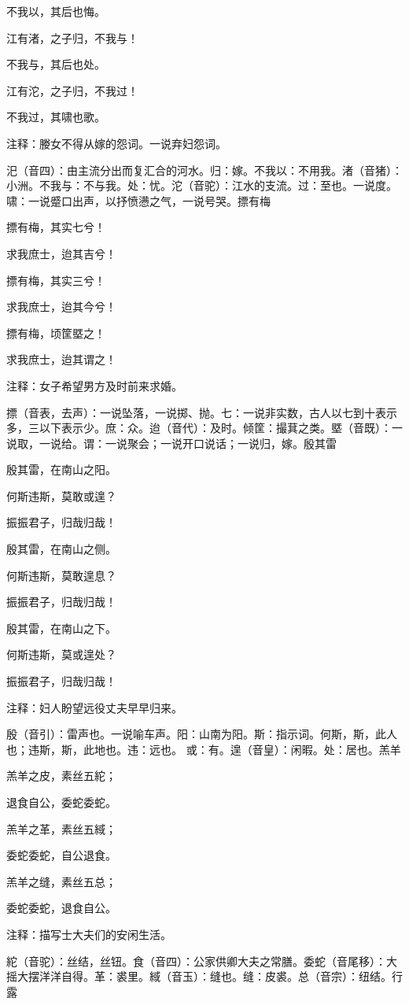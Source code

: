 \documentclass[12pt,UTF8]{ctexbook}
\begin{document}
不我以，其后也悔。

江有渚，之子归，不我与！

不我与，其后也处。

江有沱，之子归，不我过！

不我过，其啸也歌。

注释：媵女不得从嫁的怨词。一说弃妇怨词。

汜（音四）：由主流分出而复汇合的河水。归：嫁。不我以：不用我。渚（音猪）：小洲。不我与：不与我。处：忧。沱（音驼）：江水的支流。过：至也。一说度。啸：一说蹙口出声，以抒愤懑之气，一说号哭。摽有梅

摽有梅，其实七兮！

求我庶士，迨其吉兮！

摽有梅，其实三兮！

求我庶士，迨其今兮！

摽有梅，顷筐塈之！

求我庶士，迨其谓之！

注释：女子希望男方及时前来求婚。

摽（音表，去声）：一说坠落，一说掷、抛。七：一说非实数，古人以七到十表示多，三以下表示少。庶：众。迨（音代）：及时。倾筐：撮萁之类。塈（音既）：一说取，一说给。谓：一说聚会；一说开口说话；一说归，嫁。殷其雷

殷其雷，在南山之阳。

何斯违斯，莫敢或遑？

振振君子，归哉归哉！

殷其雷，在南山之侧。

何斯违斯，莫敢遑息？

振振君子，归哉归哉！

殷其雷，在南山之下。

何斯违斯，莫或遑处？

振振君子，归哉归哉！

注释：妇人盼望远役丈夫早早归来。

殷（音引）：雷声也。一说喻车声。阳：山南为阳。斯：指示词。何斯，斯，此人也；违斯，斯，此地也。违：远也。 或：有。遑（音皇）：闲暇。处：居也。羔羊

羔羊之皮，素丝五紽；

退食自公，委蛇委蛇。

羔羊之革，素丝五緎；

委蛇委蛇，自公退食。

羔羊之缝，素丝五总；

委蛇委蛇，退食自公。

注释：描写士大夫们的安闲生活。

紽（音驼）：丝结，丝钮。食（音四）：公家供卿大夫之常膳。委蛇（音尾移）：大摇大摆洋洋自得。革：裘里。緎（音玉）：缝也。缝：皮裘。总（音宗）：纽结。行露
\end{document}
